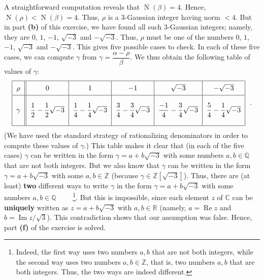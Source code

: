 \documentclass[paper=a4, fontsize=12pt]{scrartcl}%
\newcommand{\CC}{\mathbb{C}}
\newcommand{\RR}{\mathbb{R}}
\newcommand{\QQ}{\mathbb{Q}}
\newcommand{\ZZ}{\mathbb{Z}}
\newcommand{\tup}[1]{\left( #1 \right)}
\newcommand{\ive}[1]{\left[ #1 \right]}
\newcommand{\st}{\sqrt{-3}}
\newcommand{\Zst}{\ZZ\ive{\sqrt{-3}}}
\newcommand{\No}{\operatorname{N}}
\theoremstyle{plainsl}
\theoremstyle{definition}
\theoremstyle{remark}
\begin{document}
A straightforward computation reveals that
$\No\tup{\beta} = 4$. Hence,
$\No\tup{\rho} < \No\tup{\beta} = 4$.
Thus, $\rho$ is a $3$-Gaussian integer having norm $< 4$.
But in part \textbf{(b)} of this exercise, we have
found all such $3$-Gaussian integers; namely, they are
$0$, $1$, $-1$, $\st$ and $-\st$.
Thus, $\rho$ must be one of the numbers
$0$, $1$, $-1$, $\st$ and $-\st$.
This gives five possible cases to check.
In each of these five cases, we can compute
$\gamma$ from $\gamma = \dfrac{\alpha - \rho}{\beta}$.
We thus obtain the following table of values of $\gamma$:
\[%
\begin{tabular}
[c]{|c||c|c|c|c|c|}\hline
$\vphantom{\dfrac{1}{1}} \rho$ & $0$ & $1$ & $-1$ & $\sqrt{-3}$ & $-\sqrt{-3}$\\\hline
$\vphantom{\dfrac{\dfrac{1}{1}}{\dfrac{1}{1}}} \gamma$ & $\dfrac{1}{2}-\dfrac{1}{2}\sqrt{-3}$ & $\dfrac{1}{4}-\dfrac{1}{4}\sqrt{-3}$ & $\dfrac{3}{4}-\dfrac{3}{4}\sqrt{-3}$ & $\dfrac{-1}{4}-\dfrac{3}{4}\sqrt{-3}$ & $\dfrac{5}{4}-\dfrac{1}{4}\sqrt{-3}$\\\hline
\end{tabular}
\ \ .
\]
(We have used the standard strategy of rationalizing
denominators in order to compute these values of $\gamma$.)
This table makes it clear that (in each of the five cases)
$\gamma$ can be written in the form $\gamma = a + b \st$
with some numbers $a, b \in \QQ$ that are not both integers.
But we also know that $\gamma$ can be written in the form
$\gamma = a + b \st$ with some $a, b \in \ZZ$
(because $\gamma \in \Zst$).
Thus, there are (at least) \textbf{two} different ways to
write $\gamma$ in the form $\gamma = a + b \st$
with some numbers $a, b \in \QQ$
\ \ \ \ \footnote{Indeed, the first way uses two numbers
$a, b$ that are not both integers, while the second way
uses two numbers $a, b \in \ZZ$, that is, two numbers
$a, b$ that are both integers.
Thus, the two ways are indeed different.}.
But this is impossible, since each element $z$ of $\CC$
can be
\textbf{uniquely} written as $z = a + b \st$ with $a, b \in \RR$
(namely, $a = \operatorname{Re} z$ and $b = \operatorname{Im} z / \sqrt{3}$).
This contradiction shows that our assumption was false.
Hence, part \textbf{(f)} of the exercise is solved.
\end{document}
